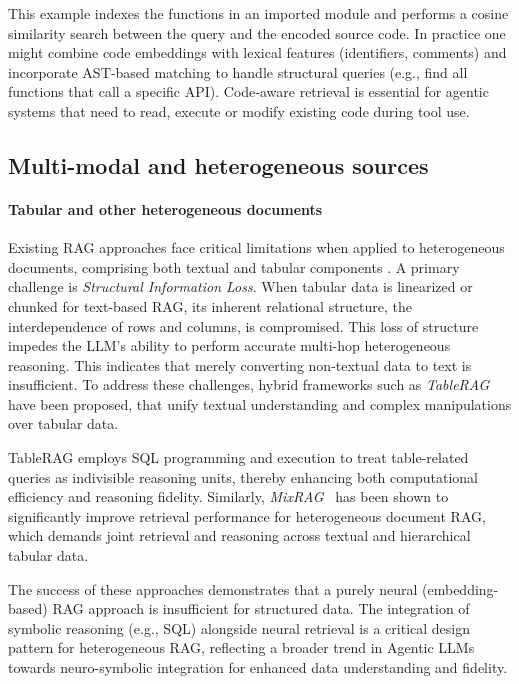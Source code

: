 This example indexes the functions in an imported module and performs a cosine similarity search between the query and the encoded source code.  In practice one might combine code embeddings with lexical features (identifiers, comments) and incorporate AST‑based matching to handle structural queries (e.g., find all functions that call a specific API).  Code‑aware retrieval is essential for agentic systems that need to read, execute or modify existing code during tool use.


\subsection{Multi-modal and heterogeneous sources}

\paragraph{Tabular and other heterogeneous documents} Existing RAG approaches face critical limitations when applied to heterogeneous documents, comprising both textual and tabular components \citep{yu2025tableragretrievalaugmentedgeneration}. A primary challenge is \textit{Structural Information Loss}. When tabular data is  linearized or chunked for text-based RAG, its inherent relational structure, the interdependence of rows and columns, is compromised. This loss of structure  impedes the LLM's ability to perform accurate multi-hop heterogeneous reasoning. This indicates that merely converting non-textual data to text is insufficient. To address these challenges, hybrid frameworks such as \emph{TableRAG}~\citep{yu2025tableragretrievalaugmentedgeneration} have been proposed, that unify textual understanding and complex manipulations over tabular data. 

TableRAG employs SQL programming and execution to treat table-related queries as indivisible reasoning units, thereby enhancing both computational efficiency and reasoning fidelity. Similarly, \emph{MixRAG}~\citep{zhang2025mixtureofragintegratingtexttables} has been shown to significantly improve retrieval performance for heterogeneous document RAG, which demands joint retrieval and reasoning across textual and hierarchical tabular data. 

The success of these approaches demonstrates that a purely neural (embedding-based) RAG approach is insufficient for structured data. The integration of symbolic reasoning (e.g., SQL) alongside neural retrieval is a critical design pattern for heterogeneous RAG, reflecting a broader trend in Agentic LLMs towards neuro-symbolic integration for enhanced data understanding and fidelity.

